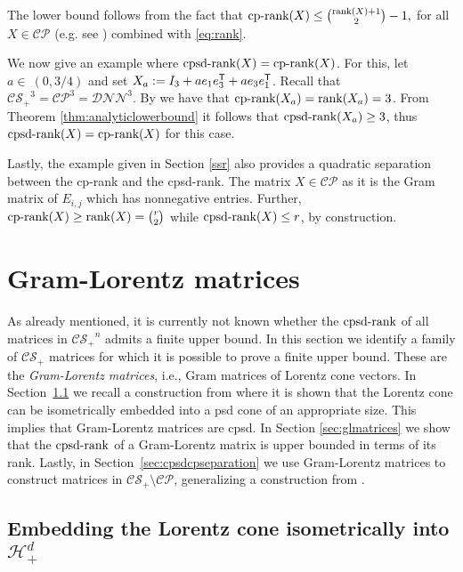 \documentclass{siamart}
\begin{document}
{{The lower bound follows from  the fact that ${\mathrm{cp}\textnormal{-rank}}(X)\le \binom{{\mathrm{rank}}(X)+1}{2}-1,$ for all $X\in {\mathcal{CP}}$ (e.g. see   \cite[Theorem 3.5]{CP}) combined with \eqref{eq:rank}.

We now give an example where ${\mathrm{cpsd}\textnormal{-rank}}(X)={\mathrm{cp}\textnormal{-rank}}(X)$.  For this, let  $a\in~(0,3/4)$ and set $X_a:=I_3+ae_1e_3^{{\sf T}}+ae_3e_1^{{\sf T}}$.
 Recall that  ${\mathcal{CS}_+}^3={\mathcal{CP}}^3={\mathcal{DNN}}^3$. By \cite[Theorem 3.2]{CP} we have that ${\mathrm{cp}\textnormal{-rank}}(X_a)={\mathrm{rank}}(X_a)=3$.  From Theorem \ref{thm:analyticlowerbound} it follows that ${\mathrm{cpsd}\textnormal{-rank}}(X_a)\ge 3$, thus ${\mathrm{cpsd}\textnormal{-rank}}(X)={\mathrm{cp}\textnormal{-rank}}(X)$ for this case.

Lastly, the  example given in Section \ref{ssr} also provides a quadratic separation between the cp-rank and the cpsd-rank.
The matrix $X \in {\mathcal{CP}}$ as it is the Gram matrix of $E_{i,j}$ which has {nonnegative} entries. Further, ${\mathrm{cp}\textnormal{-rank}}(X) \geq {\mathrm{rank}}(X)=\binom{r}{2}$ while ${\mathrm{cpsd}\textnormal{-rank}}(X) \leq r$, by construction.

\section{Gram-Lorentz matrices}\label{sec:gramlorentz}

As already mentioned,  it is  currently not known  whether
the ${\mathrm{cpsd}\textnormal{-rank}}$ of all  matrices in ${\mathcal{CS}_+}^n$ admits a finite upper bound. In this section we identify a family of ${\mathcal{CS}_+}$ matrices for which it is possible to prove a finite upper bound. These  are the {\em Gram-Lorentz matrices}, i.e.,  Gram matrices of Lorentz cone vectors. In Section~\ref{sec:embedding} we recall a construction from  \cite{FW}   where it is shown that the Lorentz cone can be
isometrically embedded into a psd  cone  of an
appropriate size.  This implies that Gram-Lorentz matrices are cpsd.  In Section \ref{sec:glmatrices}  we show  that the ${\mathrm{cpsd}\textnormal{-rank}}$ of a Gram-Lorentz matrix is upper bounded in terms of its rank. Lastly, in Section~\ref{sec:cpsdcpseparation} we use Gram-Lorentz matrices  to construct matrices in ${\mathcal{CS}_+}\setminus {\mathcal{CP}}$, generalizing a construction from \cite{FW}.

\subsection{Embedding the Lorentz cone isometrically into ${\mathcal{H}}^d_+$}\label{sec:embedding}

}}
\end{document}
